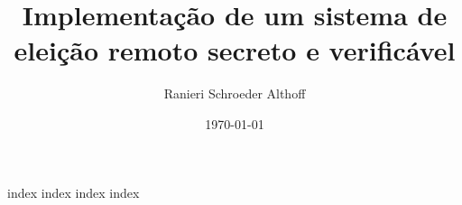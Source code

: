\documentclass[
    a5paper, %
    openright, %
    twoside, %
    english, %
    brazil, %
    chapter=TITLE,
    section=TITLE,
]{abntex2}
\title{Implementação de um sistema de eleição remoto secreto e verificável}
\author{Ranieri Schroeder Althoff}
\date{\today}
\begin{document}
\sffamily

\pretextual



\textual

{index}
{index}
{index}
{index}

\printbibliography
\end{document}
